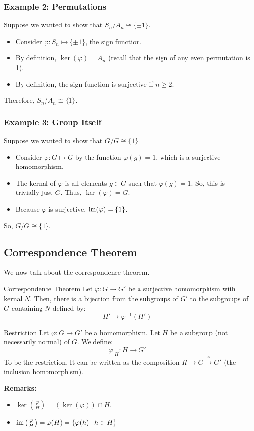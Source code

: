 \documentclass[letterpaper]{article}
\begin{document}
\subsubsection{Example 2: Permutations}
Suppose we wanted to show that $S_n / A_n \cong \{\pm 1\}$. 
\begin{itemize}
    \item Consider $\varphi: S_n \mapsto \{\pm 1\}$, the sign function. 
    \item By definition, $\ker(\varphi) = A_n$ (recall that the sign of any even permutation is 1). 
    \item By definition, the sign function is surjective if $n \geq 2$. 
\end{itemize}
Therefore, $S_n / A_n \cong \{1\}$. 

\subsubsection{Example 3: Group Itself}
Suppose we wanted to show that $G / G \cong \{1\}$.
\begin{itemize}
    \item Consider $\varphi: G \mapsto G$ by the function $\varphi(g) = 1$, which is a surjective homomorphism.
    \item The kernal of $\varphi$ is all elements $g \in G$ such that $\varphi(g) = 1$. So, this is trivially just $G$. Thus, $\ker(\varphi) = G$. 
    \item Because $\varphi$ is surjective, $\operatorname{im}(\varphi) = \{1\}$.  
\end{itemize}
So, $G / G \cong \{1\}$. 

\subsection{Correspondence Theorem}
We now talk about the correspondence theorem.
\begin{theorem}{Correspondence Theorem}{}
    Let $\varphi: G \to G'$ be a surjective homomorphism with kernal $N$. Then, there is a bijection from the subgroups of $G'$ to the subgroups of $G$ containing $N$ defined by: 
    \[H' \to \varphi^{-1}(H')\]
\end{theorem}

\begin{definition}{Restriction}{}
    Let $\varphi: G \to G'$ be a homomorphism. Let $H$ be a subgroup (not necessarily normal) of $G$. We define: 
    \[\varphi |_{H}: H \to G'\]
    To be the restriction. It can be written as the composition $H \to G \xrightarrow{\varphi} G'$ (the inclusion homomorphism). 
\end{definition}
\textbf{Remarks:}
\begin{itemize}
    \item $\ker\left(\frac{\varphi}{H}\right) = (\ker(\varphi)) \cap H$.
    \item $\operatorname{im}\left(\frac{\varphi}{H}\right) = \varphi(H) = \{\varphi(h) \mid h \in H\}$
\end{itemize}
\end{document}
